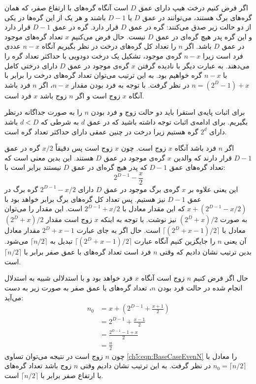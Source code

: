 اگر فرض کنیم درخت هیپ دارای عمق {$D$} است آنگاه گره‌های با ارتفاع صفر، که همان گره‌های برگ هستند، می‌توانند در عمق {$D$} یا {$D-1$} باشند و هر یک از این گره‌ها در یکی از دو حالت زیر صدق می‌کنند:
 گره‌‌ در عمق {$D$} قرار دارد.
 گره‌ در عمق {$D-1$} قرار دارد و این گره پدر هیچ گره‌ای در عمق {$D$} نیست.
حال فرض می‌کنیم {$x$}  تعداد گره‌های موجود در عمق {$D$} باشد. اگر {$n$} را تعداد کل گره‌های درخت در نظر بگیریم آنگاه {$n-x$} عددی فرد است زیرا {$n-x$} گره‌ی موجود، تشکیل یک درخت دودویی با حداکثر تعداد گره را می‌دهند. به عبارت دیگر با نادیده گرفتن {$x$} گره‌ی موجود در عمق {$D$} دارای درختی کامل با {$n-x$} گره خواهیم بود. به این ترتیب می‌توان تعداد گره‌ها‌ی درخت را برابر با {$n=(2^{D}-1)+x$} در نظر گرفت. با توجه به فرد بودن مقدار {$n-x$}، اگر {$n$} فرد باشد آنگاه {$x$} زوج است و اگر {$n$} زوج باشد {$x$} فرد است.

برای اثبات پایه‌ی استقرا باید دو حالت زوج و فرد بودن {$n$} را به صورت جداگانه درنظر بگیریم. برای ادامه‌ی اثبات توجه داشته باشید که در عمق {$d$} به شرطی که {$d<D$} باشد دارای {$2^d$} گره هستیم زیرا درخت در چنین عمقی دارای حداکثر تعداد گره است.

اگر {$n$} فرد باشد آنگاه {$x$} زوج است. چون {$x$} زوج است پس دقیقاً {$x/2$} گره در عمق {$D-1$} قرار دارند که والدین {$x$} گره‌ی موجود در عمق {$D$} هستند. این بدین معنی است که تعداد گره‌های عمق {$D-1$} که پدر هیچ گره‌ای در عمق {$D$} نیستند برابر است با:
\begin{equation}
2^{D-1}-\frac{x}{2}
\end{equation}
این یعنی علاوه بر {$x$} گره‌ی برگ موجود در عمق {$D$} دارای {$2^{D-1}-x/2$} گره برگ در عمق {$D-1$} نیز هستیم. پس تعداد کل گره‌های برگ برابر خواهد بود با {$x+(2^{D-1}-x/2)$} که این مقدار معادل با {$2^{D-1}+x/2$} است. این مقدار را می‌توان به صورت {$(2^D+x)/2$} نیز نوشت. با توجه به اینکه {$x$} زوج است مقدار {$(2^D+x)/2$} معادل با {$\lceil (2^D+x-1)/2\rceil$} است. حال اگر به جای عبارت {$2^D+x-1$} مقدار معادل آن یعنی {$n$} را جایگزین کنیم آنگاه عبارت {$\lceil (2^D+x-1)/2\rceil$} تبدیل به {$\lceil n/2\rceil$} می‌شود. بدین ترتیب نشان دادیم که وقتی {$n$} فرد است تعداد گره‌های با عمق صفر برابر با {$\lceil n/2\rceil$} است.

حال اگر فرض کنیم {$n$} زوج است آنگاه {$x$} فرد خواهد بود و با استدلالی شبیه به استدلال انجام شده در حالت فرد بودن {$n$}، تعداد گره‌های با عمق صفر به صورت زیر به دست می‌آید:
\begin{align}
n_0 &= x+\left( 2^{D-1} + \frac{x+1}{2}\right)\nonumber\\
&=2^{D-1}+\frac{x-1}{2}\nonumber\\
&=\frac{2^{D-1}-1+x}{2}\nonumber\\
&=\frac{n}{2}\label{ch5:eqn:BaseCaseEvenN}
\end{align}
چون {$n$} زوج است در نتیجه می‌توان تساوی {\eqref{ch5:eqn:BaseCaseEvenN}} را معادل با {$n_0=\lceil n/2\rceil$} در نظر گرفت. به این ترتیب نشان دادیم وقتی {$n$} زوج باشد تعداد گره‌های با ارتفاع صفر برابر با {$\lceil n/2\rceil$} است.


